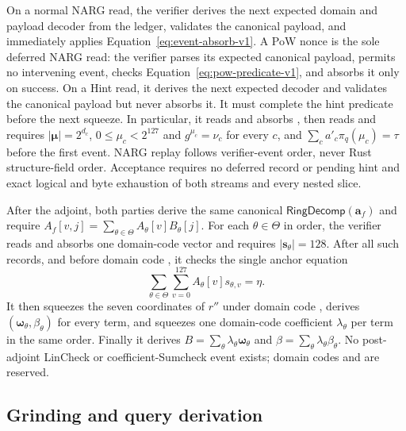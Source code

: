 On a normal NARG read, the verifier derives the next expected domain and
payload decoder from the ledger, validates the canonical payload, and
immediately applies Equation~\eqref{eq:event-absorb-v1}.  A PoW nonce is the
sole deferred NARG read: the verifier parses its expected canonical payload,
permits no intervening event, checks Equation~\eqref{eq:pow-predicate-v1}, and
absorbs it only on success.  On a Hint read, it derives the next expected
decoder and validates the canonical payload but never absorbs it.  It must
complete the hint predicate before the next squeeze.  In particular, it reads
and absorbs , then reads  and requires
$|\bm\mu|=2^{d_c}$, $0\le\mu_c<2^{127}$ and $g^{\mu_c}=\nu_c$ for every $c$,
and $\sum_ca'_c\pi_q(\mu_c)=\tau$ before the first  event.  NARG
replay follows verifier-event order, never Rust
structure-field order.  Acceptance requires no deferred record or pending
hint and exact logical and byte exhaustion of both streams and every nested
slice.

After the adjoint, both parties derive the same canonical
$\mathsf{RingDecomp}(\bm a_f)$ and require
$A_f[v,j]=\sum_{\theta\in\Theta}A_\theta[v]B_\theta[j]$.  For each
$\theta\in\Theta$ in order, the verifier reads and absorbs one domain-code
 vector and requires $|\bm s_\theta|=128$.  After all such records,
and before domain code , it checks the single anchor equation
\[
 \sum_{\theta\in\Theta}\sum_{v=0}^{127}
   A_\theta[v]s_{\theta,v}=\eta.
\]
It then squeezes the seven coordinates of $r''$ under domain code ,
derives $(\bm\omega_\theta,\beta_\theta)$ for every term, and squeezes one
domain-code  coefficient $\lambda_\theta$ per term in the same
order.  Finally it derives
$B=\sum_\theta\lambda_\theta\bm\omega_\theta$ and
$\beta=\sum_\theta\lambda_\theta\beta_\theta$.  No post-adjoint LinCheck or
coefficient-Sumcheck event exists; domain codes  and 
are reserved.

\subsection{Grinding and query derivation}
\label{sec:wire-pow}

